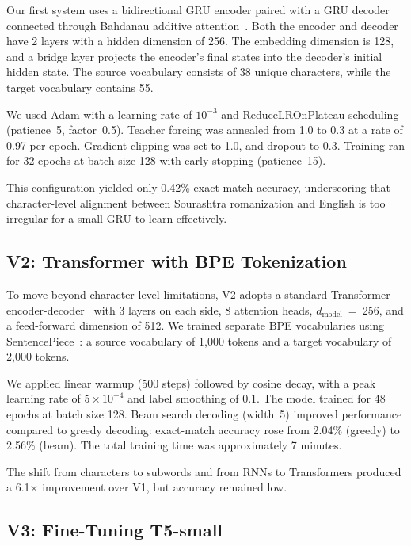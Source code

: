 \documentclass[conference]{IEEEtran}
\begin{document}
Our first system uses a bidirectional GRU encoder paired with a GRU decoder connected through Bahdanau additive attention~\cite{bahdanau2015attention}. Both the encoder and decoder have 2 layers with a hidden dimension of 256. The embedding dimension is 128, and a bridge layer projects the encoder's final states into the decoder's initial hidden state. The source vocabulary consists of 38 unique characters, while the target vocabulary contains 55.

We used Adam with a learning rate of $10^{-3}$ and ReduceLROnPlateau scheduling (patience~5, factor~0.5). Teacher forcing was annealed from 1.0 to 0.3 at a rate of 0.97 per epoch. Gradient clipping was set to 1.0, and dropout to 0.3. Training ran for 32 epochs at batch size 128 with early stopping (patience~15).

This configuration yielded only 0.42\% exact-match accuracy, underscoring that character-level alignment between Sourashtra romanization and English is too irregular for a small GRU to learn effectively.

\subsection{V2: Transformer with BPE Tokenization}

To move beyond character-level limitations, V2 adopts a standard Transformer encoder-decoder~\cite{vaswani2017attention} with 3 layers on each side, 8 attention heads, $d_\text{model}$~=~256, and a feed-forward dimension of 512. We trained separate BPE vocabularies using SentencePiece~\cite{kudo2018sentencepiece}: a source vocabulary of 1,000 tokens and a target vocabulary of 2,000 tokens.

We applied linear warmup (500 steps) followed by cosine decay, with a peak learning rate of $5 \times 10^{-4}$ and label smoothing of 0.1. The model trained for 48 epochs at batch size 128. Beam search decoding (width~5) improved performance compared to greedy decoding: exact-match accuracy rose from 2.04\% (greedy) to 2.56\% (beam). The total training time was approximately 7 minutes.

The shift from characters to subwords and from RNNs to Transformers produced a 6.1$\times$ improvement over V1, but accuracy remained low.

\subsection{V3: Fine-Tuning T5-small}
\end{document}
